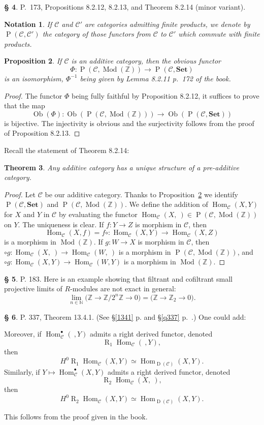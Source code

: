 \documentclass[12pt]{article}
\newtheorem{thm}{Theorem}
\newtheorem{prop}[thm]{Proposition}
\newtheorem{nota}[thm]{Notation}
\theoremstyle{remark}
\theoremstyle{definition}
\newtheorem{s}[thm]{\S}
\newcommand{\bu}{\bullet}
\newcommand{\bb}{\mathbb}
\newcommand{\oo}{\operatorname}
\newcommand{\C}{\mathcal C}
\newcommand{\Set}{\mathbf{Set}}
\newcommand{\mv}{ (minor variant)}
\DeclareMathOperator{\Hom}{Hom}%
\DeclareMathOperator{\Mod}{Mod}
\begin{document}
\begin{s}\label{8212}
P.~173, Propositions 8.2.12, 8.2.13, and Theorem 8.2.14 \mv. 
\begin{nota}
If $\C$ and $\C'$ are categories admitting finite products, we denote by $\oo P(\C,\C')$ the category of those functors from $\C$ to $\C'$ which commute with finite products.
\end{nota}
%
\begin{prop}\label{8.2.12}
If $\C$ is an additive category, then the obvious functor 
$$
\Phi:\oo P(\C,\Mod(\mathbb Z))\to\oo P(\C,\Set)
$$ 
is an isomorphism, $\Phi^{-1}$ being given by Lemma 8.2.11 p.~172 of the book.
\end{prop}
%
\begin{proof}
The functor $\Phi$ being fully faithful by Proposition 8.2.12, it suffices to prove that the map 
$$
\oo{Ob}(\Phi):\oo{Ob}(\oo P(\C,\Mod(\mathbb Z)))\to\oo{Ob}(\oo P(\C,\Set))
$$ 
is bijective. The injectivity is obvious and the surjectivity follows from the proof of Proposition 8.2.13.
\end{proof}

Recall the statement of Theorem 8.2.14:
%
\begin{thm}
Any additive category has a unique structure of a pre-additive category.
\end{thm}
%
\begin{proof}
Let $\C$ be our additive category. Thanks to Proposition~\ref{8.2.12} we identify $\oo P(\C,\Set)$ and $\oo P(\C,\Mod(\mathbb Z))$. We define the addition of $\Hom_\C(X,Y)$ for $X$ and $Y$ in $\C$ by evaluating the functor $\Hom_\C(X,\ )\in\oo P(\C,\Mod(\mathbb Z))$ on $Y$. The uniqueness is clear. If $f:Y\to Z$ is morphism in $\C$, then 
$$
\Hom_\C(X,f)=f\circ:\Hom_\C(X,Y)\to\Hom_\C(X,Z)
$$ 
is a morphism in $\Mod(\mathbb Z)$. If $g:W\to X$ is morphism in $\C$, then $\circ g:\Hom_\C(X,\ )\to\Hom_\C(W,\ )$ is a morphism in $\oo P(\C,\Mod(\mathbb Z))$, and $\circ g:\Hom_\C(X,Y)\to\Hom_\C(W,Y)$ is a morphism in $\Mod(\mathbb Z)$.
\end{proof}
\end{s}
%
%
\begin{s}\label{adic}
P. 183. Here is an example showing that filtrant and cofiltrant small projective limits of $R$-modules are not exact in general: 
$$
\lim_{n\in\bb N}\big(\bb Z\to\bb Z/2^n\bb Z\to0\big)=\big(\bb Z\to\bb Z_2\to0\big).
$$
\end{s}
%
%
\begin{s}\label{1341b}
P. 337, Theorem 13.4.1. (See \S\ref{1341} p. \pageref{1341} and \S\ref{q337} p.~\pageref{q337}.) One could add:

Moreover, if $\Hom_\C^\bu(\ ,Y)$ admits a right derived functor, denoted 
$$
\oo R_1\!\Hom_\C(\ ,Y),
$$ 
then 
$$
H^0\oo R_1\!\Hom_\C(X,Y)\simeq\Hom_{\oo D(\C)}(X,Y).
$$ 
Similarly, if $Y\mapsto\Hom_\C^\bu(X,Y)$ admits a right derived functor, denoted 
$$
\oo R_2\!\Hom_\C(X,\ ),
$$ 
then 
$$
H^0\oo R_2\!\Hom_\C(X,Y)\simeq\Hom_{\oo D(\C)}(X,Y).
$$

This follows from the proof given in the book. 
\end{s}
\end{document}
